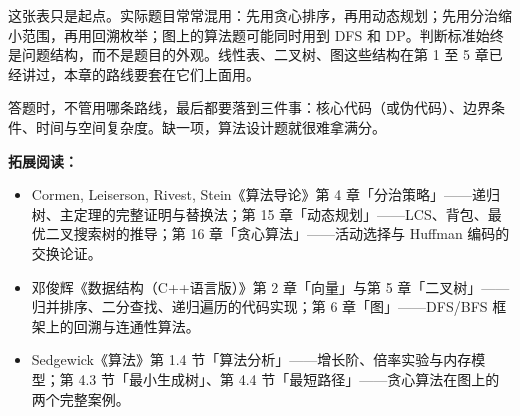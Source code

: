 这张表只是起点。实际题目常常混用：先用贪心排序，再用动态规划；先用分治缩小范围，再用回溯枚举；图上的算法题可能同时用到 DFS 和 DP。判断标准始终是问题结构，而不是题目的外观。线性表、二叉树、图这些结构在第 1 至 5 章已经讲过，本章的路线要套在它们上面用。

答题时，不管用哪条路线，最后都要落到三件事：核心代码（或伪代码）、边界条件、时间与空间复杂度。缺一项，算法设计题就很难拿满分。

\newpage

\noindent\textbf{拓展阅读：}
\begin{itemize}
    \item Cormen, Leiserson, Rivest, Stein《算法导论》第 4 章「分治策略」——递归树、主定理的完整证明与替换法；第 15 章「动态规划」——LCS、背包、最优二叉搜索树的推导；第 16 章「贪心算法」——活动选择与 Huffman 编码的交换论证。
    \item 邓俊辉《数据结构（C++语言版）》第 2 章「向量」与第 5 章「二叉树」——归并排序、二分查找、递归遍历的代码实现；第 6 章「图」——DFS/BFS 框架上的回溯与连通性算法。
    \item Sedgewick《算法》第 1.4 节「算法分析」——增长阶、倍率实验与内存模型；第 4.3 节「最小生成树」、第 4.4 节「最短路径」——贪心算法在图上的两个完整案例。
\end{itemize}
